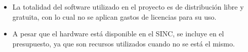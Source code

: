 \documentclass[a4paper,11pt,spanish]{article}
\begin{document}
\begin{itemize}
	\item La totalidad del software utilizado en el proyecto es de distribución libre y gratuita, con lo cual no se aplican gastos de licencias para su uso.
	\item A pesar que el hardware está disponible en el SINC, se incluye en el presupuesto, ya que son recursos utilizados cuando no se está el mismo.
\end{itemize}
\newpage


\end{document}
